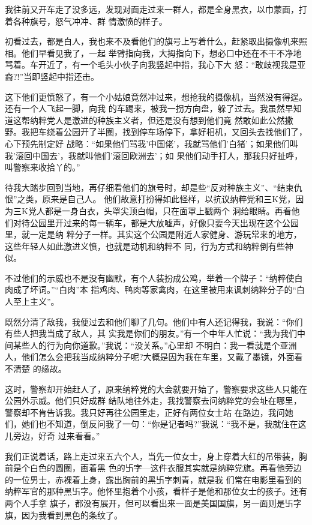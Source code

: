 ﻿\documentclass[11pt]{article}
\begin{document}
我往前又开车走了没多远，发现对面走过来一群人，都是全身黑衣，以巾蒙面，打着各种旗号，怒气冲冲、群
情激愤的样子。

初看过去，都是白人，我也来不及看他们的旗号上写着什么，赶紧取出摄像机来照相。他们早看见我了，一起
举臂指向我，大拇指向下，想必口中还在不干不净地骂着。车开近了，有一个毛头小伙子向我竖起中指，我心下大
怒：``敢歧视我是亚裔?!''当即竖起中指还击。

这下他们更愤怒了，有一个小姑娘竟然冲过来，想抢我的摄像机，当然没有得逞。还有一个人飞起一脚，向我
的车踢来，被我一拐方向盘，躲了过去。我虽然早知道这帮纳粹党人是激进的种族主义者，但还是没有想到他们竟
然敢如此公然撒野。我把车绕着公园开了半圈，找到停车场停下，拿好相机，又回头去找他们了，心下预先制定好
战略：``如果他们骂我'中国佬'，我就骂他们'白猪'；如果他们叫我'滚回中国去'，我就叫他们'滚回欧洲去'；如
果他们动手打人，那我只好扯呼，叫警察来收拾丫的。''

待我大踏步回到当地，再仔细看他们的旗号时，却是些``反对种族主义''、``结束仇恨''之类，原来是自己人。
他们故意打扮得如此怪样，以抗议纳粹党和三K党，因为三K党人都是一身白衣，头罩尖顶白帽，只在面罩上戳两个
洞给眼睛。再看他们对待公园里开过来的每一辆车，都是大放嘘声，好像只要今天出现在这个公园里，就一定是纳
粹分子一样。其实这个公园是附近人家健身、游玩常来的地方，这些年轻人如此激进义愤，也就是动机和纳粹不
同，行为方式和纳粹倒有些神似。

不过他们的示威也不是没有幽默，有个人装扮成公鸡，举着一个牌子：``纳粹使白肉成了坏词。''``白肉''本
指鸡肉、鸭肉等家禽肉，在这里被用来讽刺纳粹分子的``白人至上主义''。

既然分清了敌我，我便过去和他们聊了几句。他们中有人还记得我，我说：``你们有些人把我当成了敌人，其
实我是你们的朋友。''有一个中年人忙说：``我为我们中间某些人的行为向你道歉。''我说：``没关系。''心里却
不明白：我一看就是个亚洲人，他们怎么会把我当成纳粹分子呢?大概是因为我在车里，又戴了墨镜，外面看不清楚
的缘故。

这时，警察却开始赶人了，原来纳粹党的大会就要开始了，警察要求这些人只能在公园外示威。他们只好成群
结队地往外走，我找警察去问纳粹党的会址在哪里，警察却不肯告诉我。我只好再往公园里走，正好有两位女士站
在路边，我问她们，她们也不知道，倒反问我了一句：``你是记者吗?''我说：``我不是，我就住在这儿旁边，好奇
过来看看。''

我们正说着话，路上走过来五六个人，当先一位女士，身上穿着大红的吊带装，胸前是个白色的圆圈，画着黑
色的卐字---这件衣服其实就是纳粹党旗。再看他旁边的一位男士，赤裸着上身，露出胸前的黑卐字刺青，就是我
们常在电影里看到的纳粹军官的那种黑卐字。他怀里抱着个小孩，看样子是他和那位女士的孩子。还有两个人手拿
旗子，都没有展开，但可以看出来一面是美国国旗，另一面则是卐字旗，因为我看到黑色的条纹了。
\end{document}
